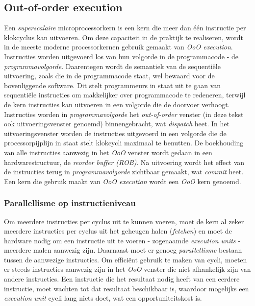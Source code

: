 \documentclass[12pt,a4paper,faculty=ea,language=nl]{ugent-doc}
\begin{document}
\subsection{Out-of-order execution}
Een \textit{superscalaire} microprocessorkern is een kern die meer dan één instructie per klokcyclus kan uitvoeren. Om deze capaciteit in de praktijk te realiseren, wordt in de meeste moderne processorkernen gebruik gemaakt van \textit{OoO execution}. Instructies worden uitgevoerd los van hun volgorde in de programmacode - de \textit{programmavolgorde}. Daarentegen wordt de semantiek van de sequentiële uitvoering, zoals die in de programmacode staat, wel bewaard voor de bovenliggende software. Dit stelt programmeurs in staat uit te gaan van sequentiële instructies om makkelijker over programmacode te redeneren, terwijl de kern instructies kan uitvoeren in een volgorde die de doorvoer verhoogt. Instructies worden in  \textit{programmavolgorde} het \textit{out-of-order} venster (in deze tekst ook uitvoeringsvenster genoemd) binnengebracht, wat \textit{dispatch} heet. In het uitvoeringsvenster worden de instructies uitgevoerd in een volgorde die de processorpijplijn in staat stelt klokcycli maximaal te benutten. De boekhouding van alle instructies aanwezig in het \textit{OoO} venster wordt gedaan in een hardwarestructuur, de \textit{reorder buffer (ROB)}. Na uitvoering wordt het effect van de instructies terug in \textit{programmavolgorde} zichtbaar gemaakt, wat \textit{commit} heet. Een kern die gebruik maakt van \textit{OoO execution} wordt een \textit{OoO} kern genoemd.


\subsubsection{Parallellisme op instructieniveau}
Om meerdere instructies per cyclus uit te kunnen voeren, moet de kern al zeker meerdere instructies per cyclus uit het geheugen halen (\textit{fetchen}) en moet de hardware nodig om een instructie uit te voeren - zogenaamde \textit{execution units} - meerdere malen aanwezig zijn. Daarnaast moet er genoeg \textit{parallellisme} bestaan tussen de aanwezige instructies. Om efficiënt gebruik te maken van cycli, moeten er steeds instructies aanwezig zijn in het \textit{OoO} venster die niet afhankelijk zijn van andere instructies. Een instructie die het resultaat nodig heeft van een eerdere instructie, moet wachten tot dat resultaat beschikbaar is, waardoor mogelijks een \textit{execution unit} cycli lang niets doet, wat een opportuniteitskost is.
\end{document}
